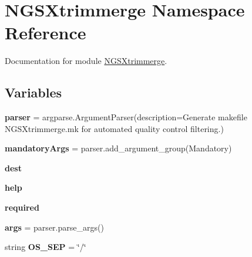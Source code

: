 \hypertarget{namespaceNGSXtrimmerge}{}\section{N\+G\+S\+Xtrimmerge Namespace Reference}
\label{namespaceNGSXtrimmerge}


Documentation for module \hyperlink{namespaceNGSXtrimmerge}{N\+G\+S\+Xtrimmerge}.  


\subsection*{Variables}
\begin{DoxyCompactItemize}
\item 
{\bfseries parser} = argparse.\+Argument\+Parser(description=\textquotesingle{}Generate makefile N\+G\+S\+Xtrimmerge.\+mk for automated quality control filtering.\textquotesingle{})\hypertarget{namespaceNGSXtrimmerge_aa5dc8d2dc04c63351c3cc044c9d12791}{}\label{namespaceNGSXtrimmerge_aa5dc8d2dc04c63351c3cc044c9d12791}

\item 
{\bfseries mandatory\+Args} = parser.\+add\+\_\+argument\+\_\+group(\textquotesingle{}Mandatory\textquotesingle{})\hypertarget{namespaceNGSXtrimmerge_aa42c50b07da49065a85ab38066f09de8}{}\label{namespaceNGSXtrimmerge_aa42c50b07da49065a85ab38066f09de8}

\item 
{\bfseries dest}\hypertarget{namespaceNGSXtrimmerge_a13179de2e0d3fc6c1efeb18fa62cb388}{}\label{namespaceNGSXtrimmerge_a13179de2e0d3fc6c1efeb18fa62cb388}

\item 
{\bfseries help}\hypertarget{namespaceNGSXtrimmerge_a0c889ce647e84c30a27f0e07648784a4}{}\label{namespaceNGSXtrimmerge_a0c889ce647e84c30a27f0e07648784a4}

\item 
{\bfseries required}\hypertarget{namespaceNGSXtrimmerge_a55b072859aceee7ef86f61a17eb030a5}{}\label{namespaceNGSXtrimmerge_a55b072859aceee7ef86f61a17eb030a5}

\item 
{\bfseries args} = parser.\+parse\+\_\+args()\hypertarget{namespaceNGSXtrimmerge_a729c968bd34e07654fcb915520b498af}{}\label{namespaceNGSXtrimmerge_a729c968bd34e07654fcb915520b498af}

\item 
string {\bfseries O\+S\+\_\+\+S\+EP} = \char`\"{}/\char`\"{}\hypertarget{namespaceNGSXtrimmerge_a077262ad7152c57b8f3e7260f7629f11}{}\label{namespaceNGSXtrimmerge_a077262ad7152c57b8f3e7260f7629f11}


\end{DoxyCompactItemize}
